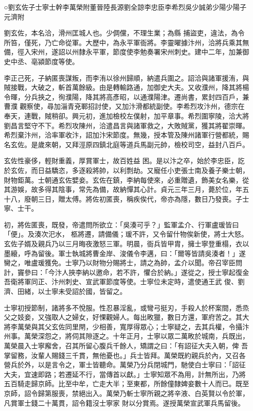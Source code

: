 
\begin{pinyinscope}

 ○劉玄佐子士寧士幹李萬榮附董晉陸長源劉全諒李忠臣李希烈吳少誠弟少陽少陽子元濟附



 劉玄佐，本名洽，滑州匡城人也。少倜儻，不理生業；為縣
 捕盜吏，違法，為令所笞，僅死，乃亡命從軍。大歷中，為永平軍衙將。李靈曜據汴州，洽將兵乘其無備，徑入宋州，遂詔以州隸永平軍，節度使李勉奏署宋州刺史。建中二年，加兼御史中丞、亳潁節度等使。



 李正己死，子納匿喪謀叛，而李洧以徐州歸順，納遣兵圍之。詔洽與諸軍援洧，與賊接戰，大破之，斬首萬餘級。由是轉輸路通，加御史大夫。又收濮州，降其將楊令暉，分兵挾之，徇濮陽，降其將高彥昭，以通濮陽津。遷尚書，累封四百戶，兼曹濮
 觀察使，尋加淄青兗鄆招討使，又加汴滑都統副使。李希烈攻汴州，德宗在奉天，連戰，賊稍卻。興元初，進加檢校左僕射，加平章事。希烈圍寧陵，洽大將劉昌言堅守不下。希烈攻陳州，洽遣昌言與諸軍救之，大敗賊黨，獲其將翟崇暉。希烈棄汴州，洽率軍收汴，詔加汴宋節度。無幾，授本管及陳州諸軍行營都統，賜名玄佐。是歲來朝，又拜涇原四鎮北庭等道兵馬副元帥，檢校司空，益封八百戶。



 玄佐性豪侈，輕財重義，厚賞軍士，故百姓益
 困。是以汴之卒，始於李忠臣，訖於玄佐，而日益驕恣，多逐殺將帥，以利剽劫。又寵任小吏張士南及養子樂士朝，財物鉅萬。士朝通玄佐嬖妾。玄佐在鎮，李納每使來，必重贈遺，飾美女名樂，從其游娛，故多得其陰事，常先為備，故納憚其心計。貞元三年三月，薨於位，年五十八，廢朝三日，贈太傅。將佐初匿喪，稱疾俟代，帝亦為隱，數日乃發喪。子士寧、士干。



 初，將佐匿喪，既發，帝遣問所欲立：「吳湊可乎？」監軍孟介、行軍盧瑗皆曰「便」。及湊次汜水，
 柩將遷，請備儀；瑗不許，又令留什物俟新使，將士大怒。玄佐子婿及親兵乃以三月晦夜激怒三軍。明晨，衙兵皆甲胄，擁士寧登重榻，衣以墨縗，呼為留後。軍士執城將曹金岸、浚儀令李邁，曰：「爾等皆請吳湊者！」遂臠之，唯盧瑗獲免。士寧乃以財物分賜將士，請之為帥，孟介以聞。帝召宰臣問計，竇參曰：「今汴人挾李納以邀命，若不許，懼合於納。」遂從之，授士寧起復金吾衛將軍同正、汴州刺史、宣武軍節度等使。士寧位未定時，遣使通王武
 俊、劉濟、田緒，以士寧未受詔於國，皆留之。



 士寧初授節制，諸將多不悅服。性忍暴淫亂，或彎弓挺刃，手殺人於杯案間，悉烝父之妓妾，又強取人之婦女，好惈觀婦人。每出畋獵，數日方還，軍府苦之。其大將李萬榮與其父玄佐同里閈，少相善，寬厚得眾心；士寧疑之，去其兵權，令攝汴州事。萬榮深怨之，將伺其隙逐之。十年正月，士寧以眾二萬畋於城南，兵既出，萬榮晨入士寧廨舍，召其所留心腹兵千餘人，矯謂之曰：「有詔征大夫入朝，俾
 吾掌留務，汝輩人賜錢三千貫，無他憂也。」兵士皆拜。萬榮既約親兵於內，又召各營兵於外，以是言令之，軍士皆聽命。萬榮乃分兵閉城門，馳使白士寧曰：「詔征大夫，宜速即路；若遷延不行，當傳首以獻。」士寧知眾不為用，計無所出，乃將五百騎走歸京師。比至中牟，亡走大半；至東都，所餘僮隸婢妾數十人而已。既至京師，詔令歸第服喪，禁絕出入。萬榮乃斬士寧所親之將辛液、白英賢以令於軍，凡賞軍士錢二十萬貫，詔令籍沒士寧家
 財以分賞焉。遂授萬榮宣武軍兵馬留後。




\end{pinyinscope}
